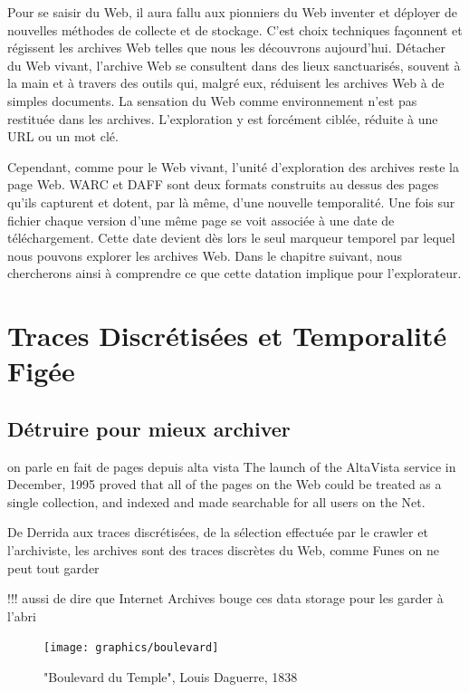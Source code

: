 \documentclass[symmetric,justified,marginals=raggedouter]{tufte-book}
\begin{document}
Pour se saisir du Web, il aura fallu aux pionniers du Web inventer et déployer de nouvelles méthodes de collecte et de stockage. C'est choix techniques façonnent et régissent les archives Web telles que nous les découvrons aujourd'hui. Détacher du Web vivant, l'archive Web se consultent dans des lieux sanctuarisés, souvent à la main et à travers des outils qui, malgré eux, réduisent les archives Web à de simples documents. La sensation du Web comme environnement n'est pas restituée dans les archives. L'exploration y est forcément ciblée, réduite à une URL ou un mot clé. 

Cependant, comme pour le Web vivant, l'unité d'exploration des archives reste la page Web. WARC et DAFF sont deux formats construits au dessus des pages qu'ils capturent et dotent, par là même, d'une nouvelle temporalité. Une fois sur fichier chaque version d'une même page se voit associée à une date de téléchargement. Cette date devient dès lors le seul marqueur temporel par lequel nous pouvons explorer les archives Web. Dans le chapitre suivant, nous chercherons ainsi à comprendre ce que cette datation implique pour l'explorateur.    


\chapter{Traces Discrétisées et Temporalité Figée} 
\label{chap:4}

\section{Détruire pour mieux archiver}
\label{sec:4_derrida}

on parle en fait de pages depuis alta vista The launch of the AltaVista service in December, 1995 proved that all
of the pages on the Web could be treated as a single collection, and
indexed and made searchable for all users on the Net.

De Derrida aux traces discrétisées, de la sélection effectuée par le crawler et l'archiviste, les archives sont des traces discrètes du Web, comme Funes on ne peut tout garder 



!!! aussi de dire que Internet Archives bouge ces data storage pour les garder à l'abri

\begin{figure}
  \centering
  \texttt{[image: graphics/boulevard]}
  \caption{"Boulevard du Temple", Louis Daguerre, 1838}
  \label{fig:boulevard}
\end{figure}
\end{document}

